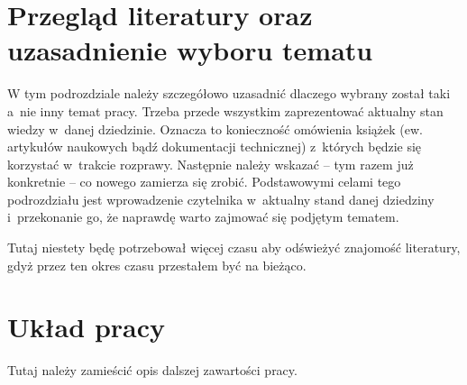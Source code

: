 \section{Przegląd literatury oraz uzasadnienie wyboru tematu}

W tym podrozdziale należy szczegółowo uzasadnić dlaczego wybrany został taki a~nie inny temat pracy. Trzeba przede wszystkim zaprezentować aktualny stan wiedzy w~danej dziedzinie. Oznacza to konieczność omówienia książek (ew. artykułów naukowych bądź dokumentacji technicznej) z~których będzie się korzystać w~trakcie rozprawy. Następnie należy wskazać -- tym razem już konkretnie -- co nowego zamierza się zrobić. Podstawowymi celami tego podrozdziału jest wprowadzenie czytelnika w~aktualny stand danej dziedziny i~przekonanie go, że naprawdę warto zajmować się podjętym tematem.

{\color{red} Tutaj niestety będę potrzebował więcej czasu aby odświeżyć znajomość literatury, gdyż przez ten okres czasu przestałem być na bieżąco.}

\section{Układ pracy}
\iffalse
{\color{red} Tutaj należy zamieścić opis dalszej zawartości pracy.}

